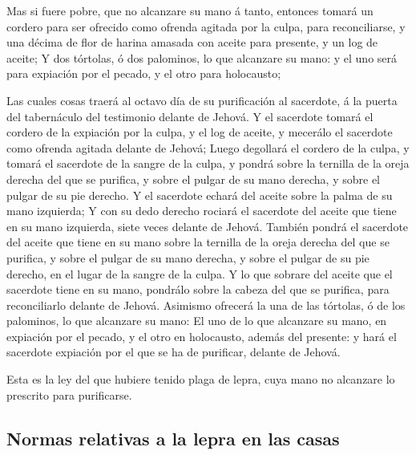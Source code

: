  Mas si fuere pobre, que no alcanzare su mano á tanto,
entonces tomará un cordero para ser ofrecido como ofrenda agitada por la
culpa, para reconciliarse, y una décima de flor de harina amasada con
aceite para presente, y un log de aceite;  Y dos
tórtolas, ó dos palominos, lo que alcanzare su mano: y el uno será para
expiación por el pecado, y el otro para holocausto;

 Las cuales cosas traerá al octavo día de su purificación
al sacerdote, á la puerta del tabernáculo del testimonio delante de
Jehová.  Y el sacerdote tomará el cordero de la expiación
por la culpa, y el log de aceite, y mecerálo el sacerdote como ofrenda
agitada delante de Jehová;  Luego degollará el cordero de
la culpa, y tomará el sacerdote de la sangre de la culpa, y pondrá sobre
la ternilla de la oreja derecha del que se purifica, y sobre el pulgar
de su mano derecha, y sobre el pulgar de su pie derecho. 
Y el sacerdote echará del aceite sobre la palma de su mano izquierda;
 Y con su dedo derecho rociará el sacerdote del aceite
que tiene en su mano izquierda, siete veces delante de Jehová.
 También pondrá el sacerdote del aceite que tiene en su
mano sobre la ternilla de la oreja derecha del que se purifica, y sobre
el pulgar de su mano derecha, y sobre el pulgar de su pie derecho, en el
lugar de la sangre de la culpa.  Y lo que sobrare del
aceite que el sacerdote tiene en su mano, pondrálo sobre la cabeza del
que se purifica, para reconciliarlo delante de Jehová. 
Asimismo ofrecerá la una de las tórtolas, ó de los palominos, lo que
alcanzare su mano:  El uno de lo que alcanzare su mano,
en expiación por el pecado, y el otro en holocausto, además del
presente: y hará el sacerdote expiación por el que se ha de purificar,
delante de Jehová.

 Esta es la ley del que hubiere tenido plaga de lepra,
cuya mano no alcanzare lo prescrito para purificarse.

\hypertarget{normas-relativas-a-la-lepra-en-las-casas}{%
\subsection{Normas relativas a la lepra en las
casas}\label{normas-relativas-a-la-lepra-en-las-casas}}

